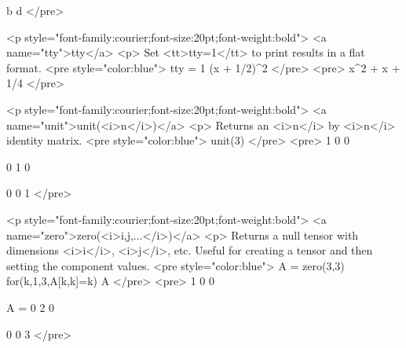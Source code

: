 b   d
</pre>

<p style="font-family:courier;font-size:20pt;font-weight:bold">
<a name="tty">tty</a>
<p>
Set <tt>tty=1</tt> to print results in a flat format.
<pre style="color:blue">
tty = 1
(x + 1/2)^2
</pre>
<pre>
x^2 + x + 1/4
</pre>

<p style="font-family:courier;font-size:20pt;font-weight:bold">
<a name="unit">unit(<i>n</i>)</a>
<p>
Returns an <i>n</i> by <i>n</i> identity matrix.
<pre style="color:blue">
unit(3)
</pre>
<pre>
1   0   0

0   1   0

0   0   1
</pre>

<p style="font-family:courier;font-size:20pt;font-weight:bold">
<a name="zero">zero(<i>i,j,...</i>)</a>
<p>
Returns a null tensor with dimensions <i>i</i>, <i>j</i>, etc.
Useful for creating a tensor and then setting the component values.
<pre style="color:blue">
A = zero(3,3)
for(k,1,3,A[k,k]=k)
A
</pre>
<pre>
    1   0   0

A = 0   2   0

    0   0   3
</pre>

\fi
